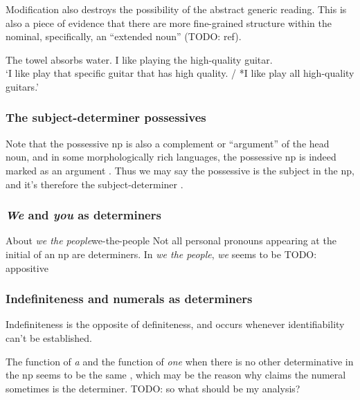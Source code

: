 \documentclass[UTF8, a4paper, oneside, scheme=plain]{ctexrep}
\newcommand*{\citesec}[1]{\S~{#1}}
\newcommand*{\citepage}[1]{p.~{#1}}
\newcommand{\corpus}[1]{\emph{#1}}
\newcommand{\translate}[1]{`#1'}
\begin{document}
Modification also destroys the possibility of the abstract generic reading.
This is also a piece of evidence that 
there are more fine-grained structure within the nominal,
specifically, an ``extended noun'' (TODO: ref).

\begin{exe}
    \ex *The towel absorbs water.
    \ex I like playing the high-quality guitar. \\
    \translate{I like play that specific guitar that has high quality.
    / *I like play all high-quality guitars.}
\end{exe}

\subsubsection{The subject-determiner possessives}

Note that the possessive \acs{np} is also a complement or ``argument''
of the head noun,
and in some morphologically rich languages,
the possessive \acs{np} is indeed marked as an argument 
\citep[\citesec{5.1.2.1}]{jacques2021grammar}.
Thus we may say the possessive is the subject in the \acs{np},
and it's therefore the subject-determiner \citep[\citepage{467}]{cgel}.

\subsubsection{\corpus{We} and \corpus{you} as determiners}

\begin{infobox}{About \corpus{we the people}}{we-the-people}
    Not all personal pronouns appearing at the initial of an \acs{np}
    are determiners.
    In \corpus{we the people}, 
    \corpus{we} seems to be TODO: appositive
\end{infobox}

\subsubsection{Indefiniteness and numerals as determiners}

Indefiniteness is the opposite of definiteness,
and occurs whenever identifiability can't be established.

The function of \corpus{a} 
and the function of \corpus{one} when there is no other determinative in the \acs{np}
seems to be the same \citep[\citepage{372}]{cgel},
which may be the reason why \citet[\citepage{385}]{cgel} claims 
the numeral sometimes is the determiner. TODO: so what should be my analysis?
\end{document}
